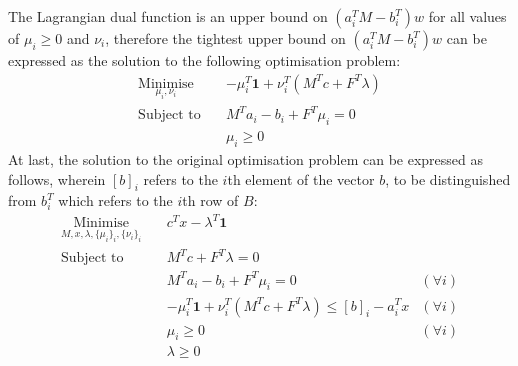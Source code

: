 The Lagrangian dual function is an upper bound on $(a_i^TM - b_i^T)w$ for all values of $\mu_i \ge 0$ and $\nu_i$, therefore the tightest upper bound on $(a_i^TM - b_i^T)w$ can be expressed as the solution to the following optimisation problem:
\begin{align*}
    \underset{\mu_i, \nu_i}{\text{Minimise}} \quad & -\mu_i^T \mathbf{1} + \nu_i^T(M^Tc + F^T\lambda) \\
    \text{Subject to} \quad & M^Ta_i - b_i + F^T\mu_i = 0 \\
    & \mu_i \ge 0
\end{align*}
At last, the solution to the original optimisation problem can be expressed as follows, wherein $[b]_i$ refers to the $i$th element of the vector $b$, to be distinguished from $b_i^T$ which refers to the $i$th row of $B$:
\begin{align*}
    \underset{M, x, \lambda, \{\mu_i\}_i, \{\nu_i\}_i}{\text{Minimise}} \quad & c^Tx - \lambda^T\mathbf{1} \\
    \text{Subject to} \quad & M^Tc + F^T\lambda = 0 \\
    & M^Ta_i - b_i + F^T\mu_i = 0 & (\forall i) \\
    & -\mu_i^T \mathbf{1} + \nu_i^T(M^Tc + F^T\lambda) \le [b]_i - a_i^Tx & (\forall i) \\
    & \mu_i \ge 0 & (\forall i) \\
    & \lambda \ge 0
\end{align*}
